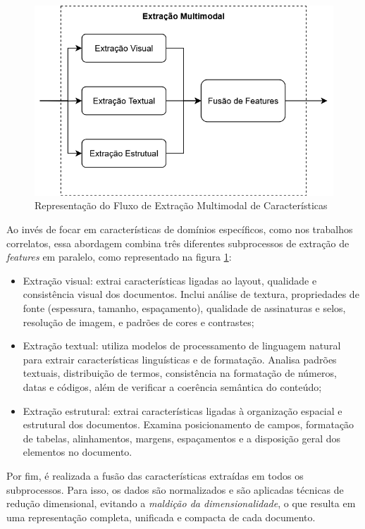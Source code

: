 \begin{figure}[H]
	\caption{\label{fig:fluxomultimodal}Representação do Fluxo de Extração Multimodal de Características}
    \begin{center}
    \includegraphics[width=1\linewidth]{images/FluxoExtracao.png}
	\end{center}
\end{figure}

Ao invés de focar em características de domínios específicos, como nos trabalhos correlatos, essa abordagem combina três diferentes subprocessos de extração de \textit{features} em paralelo, como representado na figura \ref{fig:fluxomultimodal}:

\begin{itemize}
    \item Extração visual: extrai características ligadas ao layout, qualidade e consistência visual dos documentos. Inclui análise de textura, propriedades de fonte (espessura, tamanho, espaçamento), qualidade de assinaturas e selos, resolução de imagem, e padrões de cores e contrastes;
    \item Extração textual: utiliza modelos de processamento de linguagem natural para extrair características linguísticas e de formatação. Analisa padrões textuais, distribuição de termos, consistência na formatação de números, datas e códigos, além de verificar a coerência semântica do conteúdo;
    \item Extração estrutural: extrai características ligadas à organização espacial e estrutural dos documentos. Examina posicionamento de campos, formatação de tabelas, alinhamentos, margens, espaçamentos e a disposição geral dos elementos no documento.
\end{itemize}

Por fim, é realizada a fusão das características extraídas em todos os subprocessos. Para isso, os dados são normalizados e são aplicadas técnicas de redução dimensional, evitando a \textit{maldição da dimensionalidade}, o que resulta em uma representação completa, unificada e compacta de cada documento.